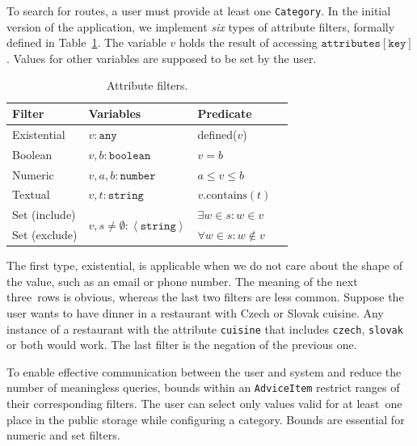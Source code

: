 To search for routes, a user must provide at least one \texttt{Category}. In the initial version of the application, we implement \emph{six} types of attribute filters, formally de\-fined in Table~\ref{tab:attribute-filters}. The variable $v$ holds the result of accessing $\texttt{attributes}\left[\texttt{key}\right]$. Values for other variables are supposed to be set by the user.

\bgroup
\def\arraystretch{1.2}
\begin{table}[!h]
\centering\footnotesize
\begin{tabular}{ l l l l }
\toprule
\textbf{Filter}
  & \textbf{Variables}
    & \textbf{Predicate} \\
\midrule
Existential
  & $v : \texttt{any}$
    & defined($v$) \\
Boolean
  & $v, b : \texttt{boolean}$
    & $v = b$ \\
Numeric
  & $v, a, b : \texttt{number}$
    & $a \leq v \leq b$ \\
Textual
  & $v, t : \texttt{string}$
    & $v.\text{contains}(t)$ \\
Set (include)
  & \multirow{2}{*}{$v, s \neq \emptyset : \left\langle\texttt{string}\right\rangle$}
    & $\exists w \in s : w \in v$ \\
Set (exclude)
  & %
    & $\forall w \in s : w \not\in v$ \\
\bottomrule
\end{tabular}
\caption{Attribute filters.}
\label{tab:attribute-filters}
\end{table}
\egroup

The first type, existential, is applicable when we do not care about the shape of the value, such as an email or phone number. The meaning of the next three~rows is obvious, whereas the last two filters are less common. Suppose the user wants to have dinner in a restaurant with Czech or Slovak cuisine. Any instance of a restaurant with the attribute \texttt{cuisine} that includes \texttt{czech}, \texttt{slovak} or both would work. The last filter is the negation of the previous one.

To enable effective communication between the user and system and reduce the number of meaningless queries, bounds within an \texttt{AdviceItem} restrict ranges of their corresponding filters. The user can select only values valid for at least~one place in the public storage while configuring a category. Bounds are essential for numeric and set filters.

